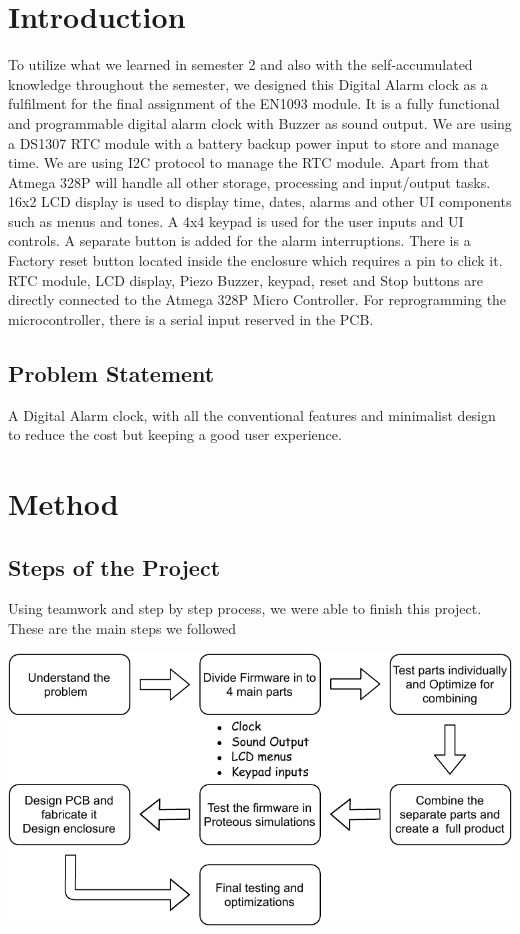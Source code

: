 \chapter{Introduction}

To utilize what we learned in semester 2 and also with the self-accumulated knowledge throughout the semester, we designed this Digital Alarm clock as a fulfilment for the final assignment of the EN1093 module. It is a fully functional and programmable digital alarm clock with Buzzer as sound output.
We are using a DS1307 RTC module with a battery backup power input to store and manage time. We are using I2C protocol to manage the RTC module. Apart from that Atmega 328P will handle all other storage, processing and input/output tasks. 16x2 LCD display is used to display time, dates, alarms and other UI components such as menus and tones. A 4x4 keypad is used for the user inputs and UI controls. A separate button is added for the alarm interruptions. There is a Factory reset button located inside the enclosure which requires a pin to click it. RTC module, LCD display, Piezo Buzzer, keypad, reset and Stop buttons are directly connected to the Atmega 328P Micro Controller. For reprogramming the microcontroller, there is a serial input reserved in the PCB.


\section{Problem Statement}

A Digital Alarm clock, with all the conventional features and minimalist design to reduce the cost but keeping a good user experience.



\chapter{Method}

\section{Steps of the Project}

Using teamwork and step by step process, we were able to finish this project. These are the main steps we followed

\begin{minipage}{0.97\textwidth}
\centering

\includegraphics[width=\textwidth]{step.pdf}
\end{minipage}

